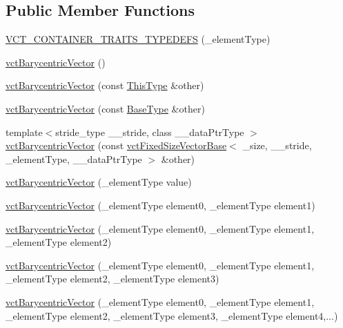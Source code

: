 \subsection*{Public Member Functions}
\begin{DoxyCompactItemize}
\item 
\hyperlink{classvct_barycentric_vector_a8b646f3c8363c436e762f7cba2e5d2c0}{V\+C\+T\+\_\+\+C\+O\+N\+T\+A\+I\+N\+E\+R\+\_\+\+T\+R\+A\+I\+T\+S\+\_\+\+T\+Y\+P\+E\+D\+E\+F\+S} (\+\_\+element\+Type)
\item 
\hyperlink{classvct_barycentric_vector_a06e12355c7d77f3b3057b0d6f7b86518}{vct\+Barycentric\+Vector} ()
\item 
\hyperlink{classvct_barycentric_vector_a46d83ab8117b92f9aefa3d0a1c3b394d}{vct\+Barycentric\+Vector} (const \hyperlink{classvct_barycentric_vector_af89123d5c607a28e2328d5d370dffb33}{This\+Type} \&other)
\item 
\hyperlink{classvct_barycentric_vector_a36adca65823ad1fa366a088e957c8b6d}{vct\+Barycentric\+Vector} (const \hyperlink{classvct_barycentric_vector_aae25bb56b435677441a223ea76745bfd}{Base\+Type} \&other)
\item 
{\footnotesize template$<$stride\+\_\+type \+\_\+\+\_\+stride, class \+\_\+\+\_\+data\+Ptr\+Type $>$ }\\\hyperlink{classvct_barycentric_vector_a29b3c331be53153b75ee3e7c088b375b}{vct\+Barycentric\+Vector} (const \hyperlink{classvct_fixed_size_vector_base}{vct\+Fixed\+Size\+Vector\+Base}$<$ \+\_\+size, \+\_\+\+\_\+stride, \+\_\+element\+Type, \+\_\+\+\_\+data\+Ptr\+Type $>$ \&other)
\item 
\hyperlink{classvct_barycentric_vector_a2e6c455fe90c510e16db4530756e92cd}{vct\+Barycentric\+Vector} (\+\_\+element\+Type value)
\item 
\hyperlink{classvct_barycentric_vector_a7098f480e5c2480892f31bbf052975e2}{vct\+Barycentric\+Vector} (\+\_\+element\+Type element0, \+\_\+element\+Type element1)
\item 
\hyperlink{classvct_barycentric_vector_a200a077eac6a5b914987fd2161ef60ea}{vct\+Barycentric\+Vector} (\+\_\+element\+Type element0, \+\_\+element\+Type element1, \+\_\+element\+Type element2)
\item 
\hyperlink{classvct_barycentric_vector_a9bd6627c056800269529e8cc64a8aaa5}{vct\+Barycentric\+Vector} (\+\_\+element\+Type element0, \+\_\+element\+Type element1, \+\_\+element\+Type element2, \+\_\+element\+Type element3)
\item 
\hyperlink{classvct_barycentric_vector_a41accc31d73ed3671315b393aabfba47}{vct\+Barycentric\+Vector} (\+\_\+element\+Type element0, \+\_\+element\+Type element1, \+\_\+element\+Type element2, \+\_\+element\+Type element3, \+\_\+element\+Type element4,...)

\end{DoxyCompactItemize}
